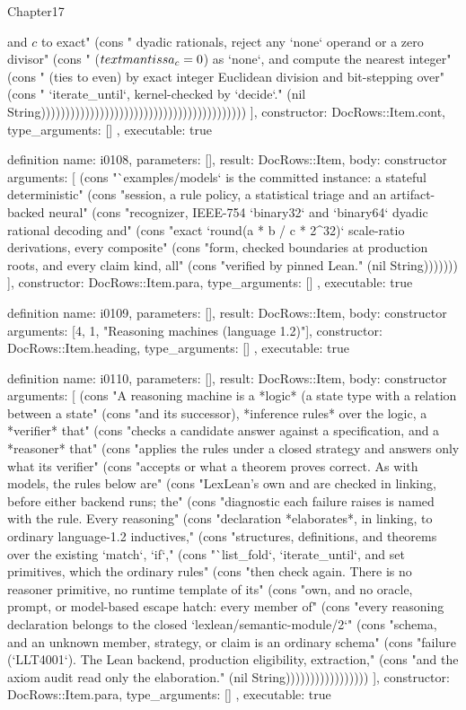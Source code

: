 \begin{lexlean}{Chapter17}
\begin{semanticmodule}
{{and $c$ to exact" (cons "      dyadic rationals, reject any `none` operand or a zero divisor" (cons "      ($\\text{mantissa}_c = 0$) as `none`, and compute the nearest integer" (cons "      (ties to even) by exact integer Euclidean division and bit-stepping over" (cons "      `iterate_until`, kernel-checked by `decide`." (nil String))))))))))))))))))))))))))))))))))))))))))
    ],
    constructor: DocRows::Item.cont,
    type_arguments: []
  },
  executable: true
}

definition{
  name: i0108,
  parameters: [],
  result: DocRows::Item,
  body: constructor{
    arguments: [
      (cons "`examples/models` is the committed instance: a stateful deterministic" (cons "session, a rule policy, a statistical triage and an artifact-backed neural" (cons "recognizer, IEEE-754 `binary32` and `binary64` dyadic rational decoding and" (cons "exact `round(a * b / c * 2^32)` scale-ratio derivations, every composite" (cons "form, checked boundaries at production roots, and every claim kind, all" (cons "verified by pinned Lean." (nil String)))))))
    ],
    constructor: DocRows::Item.para,
    type_arguments: []
  },
  executable: true
}

definition{
  name: i0109,
  parameters: [],
  result: DocRows::Item,
  body: constructor{
    arguments: [4, 1, "Reasoning machines (language 1.2)"],
    constructor: DocRows::Item.heading,
    type_arguments: []
  },
  executable: true
}

definition{
  name: i0110,
  parameters: [],
  result: DocRows::Item,
  body: constructor{
    arguments: [
      (cons "A reasoning machine is a *logic* (a state type with a relation between a state" (cons "and its successor), *inference rules* over the logic, a *verifier* that" (cons "checks a candidate answer against a specification, and a *reasoner* that" (cons "applies the rules under a closed strategy and answers only what its verifier" (cons "accepts or what a theorem proves correct. As with models, the rules below are" (cons "LexLean's own and are checked in linking, before either backend runs; the" (cons "diagnostic each failure raises is named with the rule. Every reasoning" (cons "declaration *elaborates*, in linking, to ordinary language-1.2 inductives," (cons "structures, definitions, and theorems over the existing `match`, `if`," (cons "`list_fold`, `iterate_until`, and set primitives, which the ordinary rules" (cons "then check again. There is no reasoner primitive, no runtime template of its" (cons "own, and no oracle, prompt, or model-based escape hatch: every member of" (cons "every reasoning declaration belongs to the closed `lexlean/semantic-module/2`" (cons "schema, and an unknown member, strategy, or claim is an ordinary schema" (cons "failure (`LLT4001`). The Lean backend, production eligibility, extraction," (cons "and the axiom audit read only the elaboration." (nil String)))))))))))))))))
    ],
    constructor: DocRows::Item.para,
    type_arguments: []
  },
  executable: true
}


\end{semanticmodule}
\end{lexlean}
